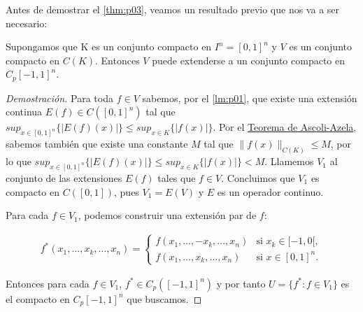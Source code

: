 Antes de demostrar el \autoref{thm:p03}, veamos un resultado previo que nos va a ser necesario: 


\begin{lema}\label{lm:p03}
Supongamos que K es un conjunto compacto en \(I^{n} = [0,1]^{n}\) y $V$ es un conjunto compacto en $C(K)$. Entonces $V$ puede extenderse a un conjunto compacto en \(C_{p}[-1,1]^{n}\).
\end{lema}
\begin{proof}[Demostración]
Para toda $f\in V$ sabemos, por el \autoref{lm:p01}, que existe una extensión continua $E(f)\in C([0,1]^{n})$ tal que $sup_{x\in [0,1]^{n}}\{\vert E(f)(x)\vert\} \leq sup_{x\in K}\{ \vert f(x)\vert\}$. Por el \hyperref[thm:h05]{Teorema de Ascoli-Azela}, sabemos también que existe una constante $M$ tal que $\|f(x)\|_{C(K)} \leq M$, por lo que $sup_{x\in [0,1]^{n}}\{\vert E(f)(x)\vert\} \leq sup_{x\in K} \{\vert f(x)\vert\} < M $.  
Llamemos $V_{1}$ al conjunto de las extensiones $E(f)$ tales que $f\in V$. Concluimos que $V_{1}$ es compacto en $C([0,1])$, pues $V_{1}=E(V)$ y $E$ es un operador continuo.


Para cada \(f \in V_{1}\), podemos construir una extensión par de $f$: 

\begin{gather}
f^{*}(x_{1},\ldots,x_{k},\ldots,x_{n}) = 
\begin{cases}
	f(x_{1},\ldots,-x_{k},\ldots,x_{n}) & \text{si }  x_{k} \in [-1,0[, \\
	f(x_{1},\ldots,x_{k},\ldots,x_{n}) & \text{si }  x\in [0,1]^{n}.  		\end{cases}
\end{gather}

Entonces para cada \(f \in V_{1}\), $f^{*}\in C_{p}([-1,1]^{n})$ y por tanto \(U = \{ f^{*} : f \in V_{1}\}\) es el compacto en \(C_{p}[-1,1]^{n}\) que buscamos. 
\end{proof}



